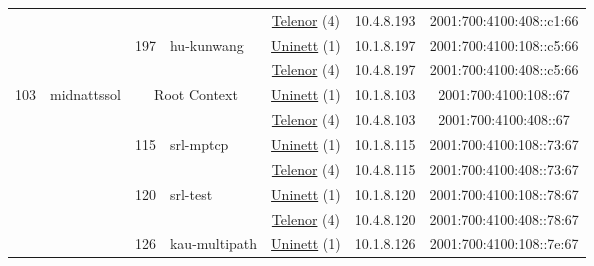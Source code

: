 \begin{small}
\begin{center}
\begin{longtable}{|c|c|c|c|c|c|c|c|}
  &  &  &  & \multicolumn{2}{|c|}{\tiny{\href{https://www.telenor.no}{Telenor} (4)}} & \tiny{10.4.8.193} & \tiny{2001:700:4100:408::c1:66} \\* \cline{3-3}\cline{4-4}\cline{5-5}\cline{6-6}\cline{7-7}\cline{8-8}
  &  & \multirow{2}{*}{\tiny{197}} & \multicolumn{1}{|l|}{\multirow{2}{*}{\tiny{hu-kunwang}}} & \multicolumn{2}{|c|}{\tiny{\href{https://www.uninett.no}{Uninett} (1)}} & \tiny{10.1.8.197} & \tiny{2001:700:4100:108::c5:66} \\* \cline{5-5}\cline{6-6}\cline{7-7}\cline{8-8}
  &  &  &  & \multicolumn{2}{|c|}{\tiny{\href{https://www.telenor.no}{Telenor} (4)}} & \tiny{10.4.8.197} & \tiny{2001:700:4100:408::c5:66} \\ \hline
 \multirow{26}{*}{\tiny{103}} & \multicolumn{1}{|l|}{\multirow{26}{*}{\tiny{midnattssol}}} & \multicolumn{2}{|c|}{\multirow{2}{*}{\tiny{Root Context}}} & \multicolumn{2}{|c|}{\tiny{\href{https://www.uninett.no}{Uninett} (1)}} & \tiny{10.1.8.103} & \tiny{2001:700:4100:108::67} \\* \cline{5-5}\cline{6-6}\cline{7-7}\cline{8-8}
  &  & \multicolumn{2}{|c|}{} & \multicolumn{2}{|c|}{\tiny{\href{https://www.telenor.no}{Telenor} (4)}} & \tiny{10.4.8.103} & \tiny{2001:700:4100:408::67} \\* \cline{3-3}\cline{4-4}\cline{5-5}\cline{6-6}\cline{7-7}\cline{8-8}
  &  & \multirow{2}{*}{\tiny{115}} & \multicolumn{1}{|l|}{\multirow{2}{*}{\tiny{srl-mptcp}}} & \multicolumn{2}{|c|}{\tiny{\href{https://www.uninett.no}{Uninett} (1)}} & \tiny{10.1.8.115} & \tiny{2001:700:4100:108::73:67} \\* \cline{5-5}\cline{6-6}\cline{7-7}\cline{8-8}
  &  &  &  & \multicolumn{2}{|c|}{\tiny{\href{https://www.telenor.no}{Telenor} (4)}} & \tiny{10.4.8.115} & \tiny{2001:700:4100:408::73:67} \\* \cline{3-3}\cline{4-4}\cline{5-5}\cline{6-6}\cline{7-7}\cline{8-8}
  &  & \multirow{2}{*}{\tiny{120}} & \multicolumn{1}{|l|}{\multirow{2}{*}{\tiny{srl-test}}} & \multicolumn{2}{|c|}{\tiny{\href{https://www.uninett.no}{Uninett} (1)}} & \tiny{10.1.8.120} & \tiny{2001:700:4100:108::78:67} \\* \cline{5-5}\cline{6-6}\cline{7-7}\cline{8-8}
  &  &  &  & \multicolumn{2}{|c|}{\tiny{\href{https://www.telenor.no}{Telenor} (4)}} & \tiny{10.4.8.120} & \tiny{2001:700:4100:408::78:67} \\* \cline{3-3}\cline{4-4}\cline{5-5}\cline{6-6}\cline{7-7}\cline{8-8}
  &  & \multirow{2}{*}{\tiny{126}} & \multicolumn{1}{|l|}{\multirow{2}{*}{\tiny{kau-multipath}}} & \multicolumn{2}{|c|}{\tiny{\href{https://www.uninett.no}{Uninett} (1)}} & \tiny{10.1.8.126} & \tiny{2001:700:4100:108::7e:67} \\* \cline{5-5}\cline{6-6}\cline{7-7}\cline{8-8}

\end{longtable}
\end{center}
\end{small}
